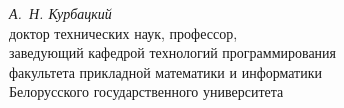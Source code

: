 \begin{partbacktext}
\begin{flushright}\noindent
\hfill {\it А.~Н. Курбацкий}\\
\hfill доктор технических наук, профессор,\\
\hfill заведующий кафедрой технологий программирования\\
\hfill факультета прикладной математики и информатики\\
\hfill Белорусского государственного университета
\end{flushright}

\end{partbacktext}